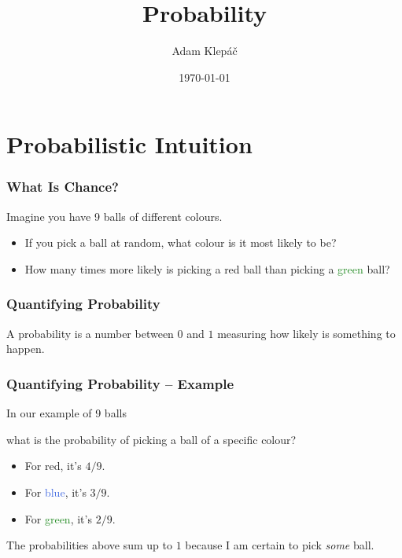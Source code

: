 \documentclass[aspectratio=169,11pt,usenames,dvipsnames,handout]{beamer}
\title{Probability}
\date{\today}
\author{Adam Klepáč}
\institute[GEVO]{Gymnázium Evolution Jižní Město}
\newcommand{\clr}{\textcolor{BrickRed}}
\newcommand{\clb}{\textcolor{RoyalBlue}}
\newcommand{\clg}{\textcolor{ForestGreen}}
\begin{document}
\titleframe

\section{Probabilistic Intuition}
\label{sec:probabilistic-intuition}

\begin{frame}
 \frametitle{What Is Chance?}
 Imagine you have 9 balls of different colours.\pause
 \begin{center}
 \end{center}
 \pause
 \begin{itemize}
  \item If you pick a ball \alert{at random}, what colour is it most likely to
   be?\pause
  \item How many times more likely is picking a \clr{red} ball than picking a
   \clg{green} ball?\pause
 \end{itemize}
\end{frame}

\begin{frame}
 \frametitle{Quantifying Probability}
 \begin{tcolorbox}[title=Probability]
  A \alert{probability} is a number between $0$ and $1$ measuring how
  \alert{likely} is something to happen.
 \end{tcolorbox}
\end{frame}

\begin{frame}
 \frametitle{Quantifying Probability -- Example}
 In our example of 9 balls
 \begin{center}
  \vspace*{-2em}
 \end{center}
 what is the probability of picking a ball of a specific colour?\pause
 \begin{itemize}
  \item For \clr{red}, it's $4 / 9$.
  \item For \clb{blue}, it's $3 / 9$.
  \item For \clg{green}, it's $2 / 9$.
 \end{itemize}\pause
 The probabilities above \alert{sum up to $1$} because I am certain to pick
 \emph{some} ball.
\end{frame}
\end{document}
